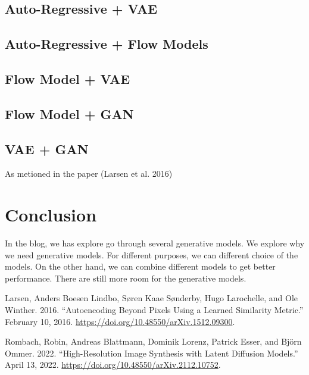 \documentclass[
  12pt,
]{article}
\newlength{\cslhangindent}
\newenvironment{CSLReferences}[2] %
 {\begin{list}{}{%
  \setlength{\itemindent}{0pt}
  \setlength{\leftmargin}{0pt}
  \setlength{\parsep}{0pt}
  \ifodd #1
   \setlength{\leftmargin}{\cslhangindent}
   \setlength{\itemindent}{-1\cslhangindent}
  \fi
  \setlength{\itemsep}{#2\baselineskip}}}
 {\end{list}}
\theoremstyle{plain}
\theoremstyle{remark}
\begin{document}
\subsection{Auto-Regressive + VAE}\label{auto-regressive-vae}

\subsection{Auto-Regressive + Flow
Models}\label{auto-regressive-flow-models}

\subsection{Flow Model + VAE}\label{flow-model-vae}

\subsection{Flow Model + GAN}\label{flow-model-gan}

\subsection{VAE + GAN}\label{vae-gan}

As metioned in the paper (Larsen et al. 2016)

\section{Conclusion}\label{conclusion}

In the blog, we has explore go through several generative models. We
explore why we need generative models. For different purposes, we can
different choice of the models. On the other hand, we can combine
different models to get better performance. There are still more room
for the generative models.\\

\label{refs}
\begin{CSLReferences}{1}{0}
Larsen, Anders Boesen Lindbo, Søren Kaae Sønderby, Hugo Larochelle, and
Ole Winther. 2016. {``Autoencoding Beyond Pixels Using a Learned
Similarity Metric.''} February 10, 2016.
\url{https://doi.org/10.48550/arXiv.1512.09300}.

Rombach, Robin, Andreas Blattmann, Dominik Lorenz, Patrick Esser, and
Björn Ommer. 2022. {``High-{Resolution Image Synthesis} with {Latent
Diffusion Models}.''} April 13, 2022.
\url{https://doi.org/10.48550/arXiv.2112.10752}.

\end{CSLReferences}
\end{document}

